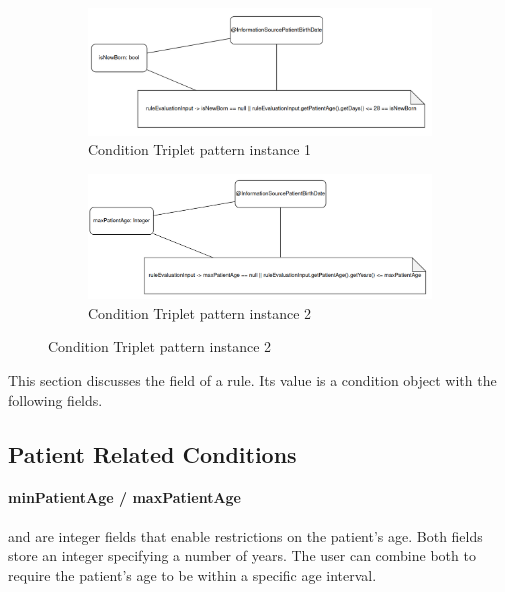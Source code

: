 \begin{figure}
    \centering
    \begin{subfigure}[b]{0.45\linewidth}
        \centering
        \includegraphics[width=\linewidth]{./figures/ctp-is-new-born}
        \caption{Condition Triplet pattern instance 1}
        \label{fig:condition-triplet-pattern-instance-1}
    \end{subfigure}
    \hspace{5mm} %
    \begin{subfigure}[b]{0.45\linewidth}
        \centering
        \includegraphics[width=\linewidth]{./figures/ctp-max-patient-age}
        \caption{Condition Triplet pattern instance 2}
        \label{fig:condition-triplet-pattern-instance-2}
    \end{subfigure}
    \label{fig:coffee}
\end{figure}
This section discusses the  field of a rule.
Its value is a condition object with the following fields.

\subsection{Patient Related Conditions}\label{subsec:patient-related-conditions}

\paragraph{minPatientAge / maxPatientAge}
 and  are integer fields that enable restrictions on the patient's age.
Both fields store an integer specifying a number of years.
The user can combine both to require the patient's age to be within a specific age interval.


